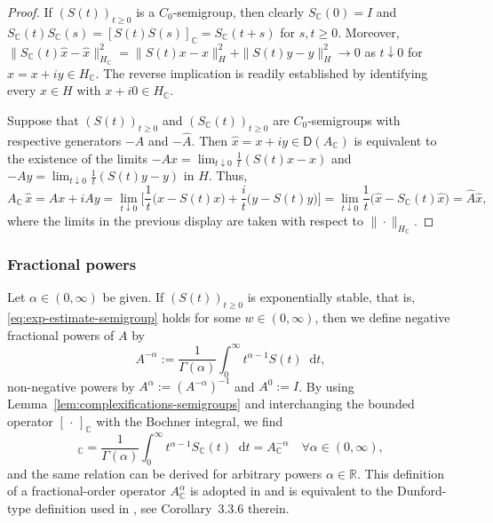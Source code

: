 \documentclass[reqno]{amsart}
\numberwithin{equation}{section}
\newcommand{\R}{\mathbb{R}}
\newcommand{\C}{\mathbb{C}}
\newcommand{\norm}[2]{     \| #1       \|_{ #2 }}
\newcommand{\rd}{\mathop{}\!\mathrm{d}}
\theoremstyle{remark}
\theoremstyle{definition}
\begin{document}
\begin{proof}
	If $(S(t))_{t\ge0}$ is a $C_0$-semigroup, then clearly $S_\C(0) = I$ and $S_\C(t)S_\C(s) = [S(t)S(s)]_\C = S_\C(t+s)$ for $s,t\ge0$. Moreover,
	$\norm{S_\C(t)\widehat x - \widehat x}{H_\C}^2 
	=
	\norm{S(t)x-x}{H}^2 + \norm{S(t)y-y}{H}^2 \to 0
	$
	as $t \downarrow 0$
	for $\widehat x = x+iy\in H_\C$.
	The reverse implication is 
	readily established by identifying 
	every $x \in H$ 
	with $x + i0 \in H_\C$. 
	
	Suppose that
	$(S(t))_{t\ge0}$ 
	and 
	$(S_\C(t))_{t\ge0}$
	are $C_0$-semigroups with respective generators $-A$ and $-\widehat A$.
	Then 
	$\widehat x = x + iy \in \mathsf D(A_\C)$
	is equivalent to the existence
	of the limits 
	$-Ax = \lim_{t\downarrow 0} \frac{1}{t}(S(t)x - x)$
	and
	$-Ay = \lim_{t\downarrow 0} \frac{1}{t}(S(t)y - y)$
	in $H$. Thus,
	\[ 
	A_\C \, \widehat x
	= Ax + iAy
	= \lim_{t\downarrow 0} 
	\biggl[
	\frac{1}{t} \bigl(x - S(t)x \bigr)
	+ \frac{i}{t} \bigl( y - S(t)y \bigr) 
	\biggr]
	= \lim_{t\downarrow 0} \frac{1}{t} 
	\bigl( \widehat x - S_\C(t)\widehat x \bigr)
	= \widehat A \widehat x,
	\] 
	where the limits in the previous display are taken with respect to 
	$\|\cdot\|_{H_\C}$.
\end{proof}


\subsubsection{Fractional powers} 
\label{subsec:appendix-functional-calc:frac-powers}

Let $\alpha\in(0,\infty)$ be given. If
$(S(t))_{t\ge0}$ is exponentially stable, 
that is, \eqref{eq:exp-estimate-semigroup}  
holds for some $w\in(0,\infty)$, 
then we define negative fractional powers
of $A$ by 
%
\begin{equation}\label{eq:fractional-power-exp-bdd-semigroup}  
A^{-\alpha} := \frac{1}{\Gamma(\alpha)}\int_0^\infty t^{\alpha-1}S(t)\rd t,
\end{equation} 
%
non-negative powers by $A^\alpha := (A^{-\alpha})^{-1}$  
and $A^0:=I$.
By using Lemma~\ref{lem:complexifications-semigroups}
and interchanging the bounded operator $[\,\cdot\,]_\C$
with the Bochner integral, 
we find 
%
\begin{equation*}
[A^{-\alpha}]_\C 
= 
\frac{1}{\Gamma(\alpha)}\int_0^\infty t^{\alpha-1}S_\C(t)\rd t 
= 
A_\C^{-\alpha} \quad \forall \alpha\in(0,\infty),
\end{equation*}
%
and the same relation can be derived for arbitrary powers $\alpha\in\R$.
This definition of a fractional-order operator $A_\C^{\alpha}$ is adopted in
\cite[Chapter~2, Section~6]{Pazy1983} and is 
equivalent to the Dunford-type definition 
used in \cite{Haase2006}, 
see Corollary~3.3.6 therein. 
\end{document}
